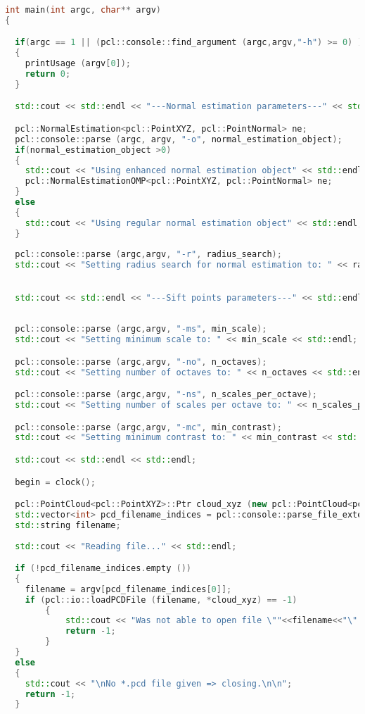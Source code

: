 \begin{lstlisting}[language=C++,breaklines]
int main(int argc, char** argv)
{

  if(argc == 1 || (pcl::console::find_argument (argc,argv,"-h") >= 0) )
  {
	printUsage (argv[0]);
	return 0;
  }	

  std::cout << std::endl << "---Normal estimation parameters---" << std::endl;

  pcl::NormalEstimation<pcl::PointXYZ, pcl::PointNormal> ne;
  pcl::console::parse (argc, argv, "-o", normal_estimation_object);
  if(normal_estimation_object >0)
  {
	std::cout << "Using enhanced normal estimation object" << std::endl;
	pcl::NormalEstimationOMP<pcl::PointXYZ, pcl::PointNormal> ne;
  }
  else
  {
	std::cout << "Using regular normal estimation object" << std::endl;
  }
  
  pcl::console::parse (argc,argv, "-r", radius_search);
  std::cout << "Setting radius search for normal estimation to: " << radius_search << std::endl;

  
  std::cout << std::endl << "---Sift points parameters---" << std::endl;
  
  
  pcl::console::parse (argc,argv, "-ms", min_scale);
  std::cout << "Setting minimum scale to: " << min_scale << std::endl;

  pcl::console::parse (argc,argv, "-no", n_octaves);
  std::cout << "Setting number of octaves to: " << n_octaves << std::endl;

  pcl::console::parse (argc,argv, "-ns", n_scales_per_octave);
  std::cout << "Setting number of scales per octave to: " << n_scales_per_octave << std::endl;

  pcl::console::parse (argc,argv, "-mc", min_contrast);
  std::cout << "Setting minimum contrast to: " << min_contrast << std::endl;

  std::cout << std::endl << std::endl;

  begin = clock();

  pcl::PointCloud<pcl::PointXYZ>::Ptr cloud_xyz (new pcl::PointCloud<pcl::PointXYZ>);
  std::vector<int> pcd_filename_indices = pcl::console::parse_file_extension_argument (argc, argv, "pcd"); 
  std::string filename;
     
  std::cout << "Reading file..." << std::endl;

  if (!pcd_filename_indices.empty ())
  {
  	filename = argv[pcd_filename_indices[0]];
  	if (pcl::io::loadPCDFile (filename, *cloud_xyz) == -1) 
    	{
        	std::cout << "Was not able to open file \""<<filename<<"\".\n";
       		return -1;
    	}
  }
  else
  {
  	std::cout << "\nNo *.pcd file given => closing.\n\n";
  	return -1;
  }
  

\end{lstlisting}
